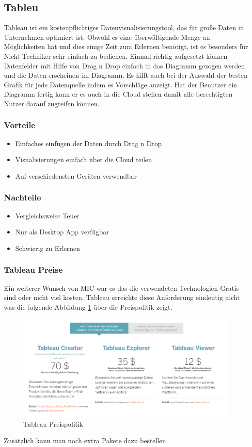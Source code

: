\subsection{Tableu}
Tableau ist ein kostenpflichtiges Datenvisualisierungstool, das für große Daten in Unternehmen optimiert ist. Obwohl es eine überwältigende Menge an Möglichkeiten hat und dies einige Zeit zum Erlernen benötigt, ist es besonders für Nicht-Techniker sehr einfach zu bedienen. Einmal richtig aufgesetzt können Datenfelder mit Hilfe von Drag n Drop einfach in das Diagramm gezogen werden und die Daten erscheinen im Diagramm. Es hilft auch bei der Auswahl der besten Grafik für jede Datenquelle indem es Vorschläge anzeigt. Hat der Benutzer ein Diagramm fertig kann er es auch in die Cloud stellen damit alle berechtigten Nutzer darauf zugreifen können. 
\subsubsection{Vorteile}
\begin{itemize}
\item Einfaches einfügen der Daten durch Drag n Drop
\item Visualisierungen einfach über die Cloud teilen
\item Auf verschiedensten Geräten verwendbar
\end{itemize}
\subsubsection{Nachteile}
\begin{itemize}
\item Vergleichsweise Teuer
\item Nur als Desktop App verfügbar 
\item Schwierig zu Erlernen
\end{itemize}
\subsubsection{Tableau Preise}
Ein weiterer Wunsch von MIC war es das die verwendeten Technologien Gratis sind oder nicht viel kosten. Tableau erreichte diese Anforderung eindeutig nicht was die folgende Abbildung \ref{img:tableu_preise} über die Preispolitik zeigt.
\begin{figure}
    \centering
    \includegraphics[scale=.45]{images/Tableau_Preise.png}
    \caption{Tableau Preispolitik}
    \label{img:tableu_preise}
\end{figure}
Zusätzlich kann man noch extra Pakete dazu bestellen

